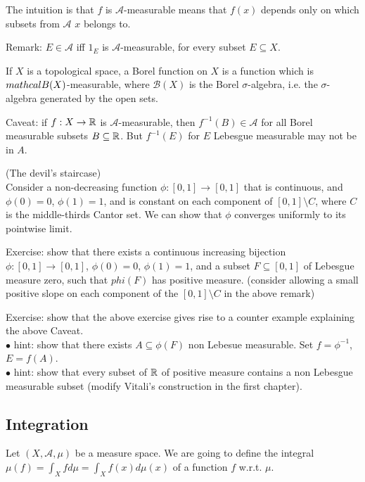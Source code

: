 \documentclass[a4paper]{article}
\begin{document}
The intuition is that $f$ is $\mathcal{A}$-measurable means that $f(x)$ depends only on which subsets from $\mathcal{A}$ $x$ belongs to.

Remark: $E \in \mathcal{A}$ iff $1_E$ is $\mathcal{A}$-measurable, for every subset $E \subseteq X$.

\begin{defi}
If $X$ is a topological space, a Borel function on $X$ is a function which is $\\mathcal{B}(X)$-measurable, where $\mathcal{B}(X)$ is the Borel $\sigma$-algebra, i.e. the $\sigma$-algebra generated by the open sets.
\end{defi}

Caveat: if $f:X \to \mathbb{R}$ is $\mathcal{A}$-measurable, then $f^{-1}(B) \in \mathcal{A}$ for all Borel measurable subsets $B \subseteq \mathbb{R}$. But $f^{-1}(E)$ for $E$ Lebesgue measurable may not be in $A$.

\begin{rem} (The devil's staircase)\\
Consider a non-decreasing function $\phi:[0,1] \to [0,1]$ that is continuous, and $\phi(0) = 0$, $\phi(1) = 1$, and is constant on each component of $[0,1] \setminus C$, where $C$ is the middle-thirds Cantor set. We can show that $\phi$ converges uniformly to its pointwise limit.
\end{rem}

Exercise: show that there exists a continuous increasing bijection $\phi:[0,1] \to [0,1]$, $\phi(0) = 0$, $\phi(1) = 1$, and a subset $F\subseteq [0,1]$ of Lebesgue measure zero, such that $phi(F)$ has positive measure. (consider allowing a small positive slope on each component of the $[0,1] \setminus C$ in the above remark)

Exercise: show that the above exercise gives rise to a counter example explaining the above Caveat.\\
$\bullet$ hint: show that there exists $A \subseteq \phi(F)$ non Lebesue measurable. Set $f = \phi^{-1}$, $E = f(A)$.\\
$\bullet$ hint: show that every subset of $\mathbb{R}$ of positive measure contains a non Lebesgue measurable subset (modify Vitali's construction in the first chapter).

\subsection{Integration}
Let $(X,\mathcal{A},\mu)$ be a measure space. We are going to define the integral $\mu(f) = \int_X f d\mu = \int_X f(x) d\mu(x)$ of a function $f$ w.r.t. $\mu$.
\end{document}
